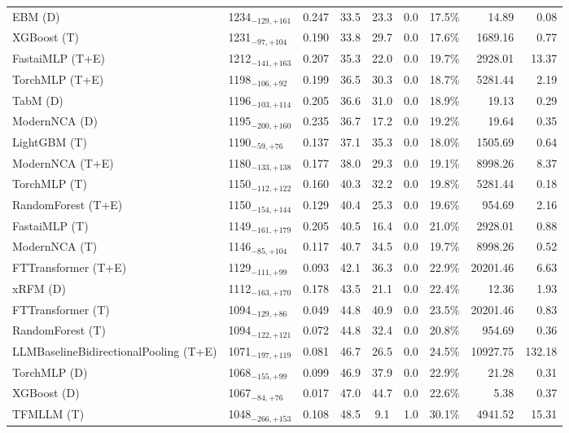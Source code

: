 \begin{tabular}{llcccccrr}
EBM (D) & 1234${}_{-129,+161}$ & 0.247 & 33.5 & 23.3 & 0.0 & 17.5\% & 14.89 & 0.08 \\
XGBoost (T) & 1231${}_{-97,+104}$ & 0.190 & 33.8 & 29.7 & 0.0 & 17.6\% & 1689.16 & 0.77 \\
FastaiMLP (T+E) & 1212${}_{-141,+163}$ & 0.207 & 35.3 & 22.0 & 0.0 & 19.7\% & 2928.01 & 13.37 \\
TorchMLP (T+E) & 1198${}_{-106,+92}$ & 0.199 & 36.5 & 30.3 & 0.0 & 18.7\% & 5281.44 & 2.19 \\
TabM (D) & 1196${}_{-103,+114}$ & 0.205 & 36.6 & 31.0 & 0.0 & 18.9\% & 19.13 & 0.29 \\
ModernNCA (D) & 1195${}_{-200,+160}$ & 0.235 & 36.7 & 17.2 & 0.0 & 19.2\% & 19.64 & 0.35 \\
LightGBM (T) & 1190${}_{-59,+76}$ & 0.137 & 37.1 & 35.3 & 0.0 & 18.0\% & 1505.69 & 0.64 \\
ModernNCA (T+E) & 1180${}_{-133,+138}$ & 0.177 & 38.0 & 29.3 & 0.0 & 19.1\% & 8998.26 & 8.37 \\
TorchMLP (T) & 1150${}_{-112,+122}$ & 0.160 & 40.3 & 32.2 & 0.0 & 19.8\% & 5281.44 & 0.18 \\
RandomForest (T+E) & 1150${}_{-154,+144}$ & 0.129 & 40.4 & 25.3 & 0.0 & 19.6\% & 954.69 & 2.16 \\
FastaiMLP (T) & 1149${}_{-161,+179}$ & 0.205 & 40.5 & 16.4 & 0.0 & 21.0\% & 2928.01 & 0.88 \\
ModernNCA (T) & 1146${}_{-85,+104}$ & 0.117 & 40.7 & 34.5 & 0.0 & 19.7\% & 8998.26 & 0.52 \\
FTTransformer (T+E) & 1129${}_{-111,+99}$ & 0.093 & 42.1 & 36.3 & 0.0 & 22.9\% & 20201.46 & 6.63 \\
xRFM (D) & 1112${}_{-163,+170}$ & 0.178 & 43.5 & 21.1 & 0.0 & 22.4\% & 12.36 & 1.93 \\
FTTransformer (T) & 1094${}_{-129,+86}$ & 0.049 & 44.8 & 40.9 & 0.0 & 23.5\% & 20201.46 & 0.83 \\
RandomForest (T) & 1094${}_{-122,+121}$ & 0.072 & 44.8 & 32.4 & 0.0 & 20.8\% & 954.69 & 0.36 \\
LLMBaselineBidirectionalPooling (T+E) & 1071${}_{-197,+119}$ & 0.081 & 46.7 & 26.5 & 0.0 & 24.5\% & 10927.75 & 132.18 \\
TorchMLP (D) & 1068${}_{-155,+99}$ & 0.099 & 46.9 & 37.9 & 0.0 & 22.9\% & 21.28 & 0.31 \\
XGBoost (D) & 1067${}_{-84,+76}$ & 0.017 & 47.0 & 44.7 & 0.0 & 22.6\% & 5.38 & 0.37 \\
TFMLLM (T) & 1048${}_{-266,+153}$ & 0.108 & 48.5 & 9.1 & 1.0 & 30.1\% & 4941.52 & 15.31 \\

\end{tabular}
